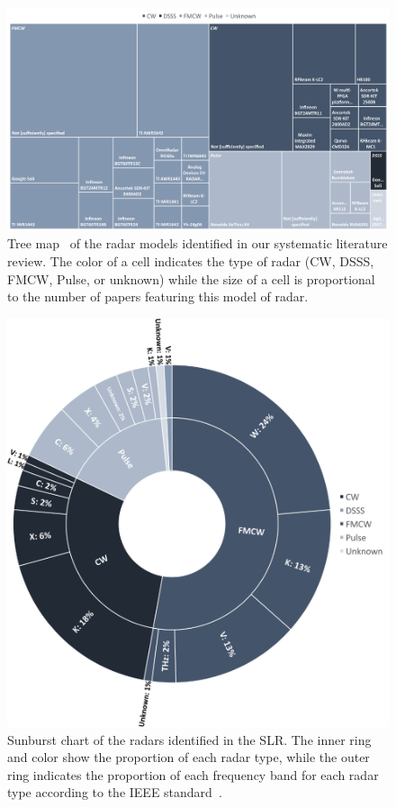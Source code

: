 \begin{figure}[t]
    \centering
    \includegraphics[width=\linewidth]{Figures/StateOfTheArt/Radar/treemap-radar-types-models.pdf}
    \vspace{-16pt}
    \caption{Tree map~\cite{Shneiderman:1992} of the radar models identified in our systematic literature review. 
    The color of a cell indicates the type of radar (CW, DSSS, FMCW, Pulse, or unknown) while the size of a cell is proportional to the number of papers featuring this model of radar.}
    \label{fig:state_of_the_art:radar:radars}
\end{figure}

\begin{figure}[t]
    \centering
    \includegraphics[width=.8\linewidth]{Figures/StateOfTheArt/Radar/diagram-radar-types-frequencies.pdf}
    \vspace{-4pt}
    \caption{Sunburst chart of the radars identified in the SLR. The inner ring and color show the proportion of each radar type, while the outer ring indicates the proportion of each frequency band for each radar type according to the IEEE standard~\cite{IEEE:2020}.}
    \label{fig:state_of_the_art:radar:radars-types-frequencies}
    \vspace{-4pt}
\end{figure}

